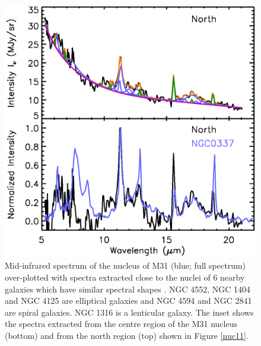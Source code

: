 \begin{figure}
\centering
\includegraphics[height = 8 cm]{./fig11.eps}
\caption{Mid-infrared spectrum of the nucleus of M31 (blue; full spectrum) over-plotted with spectra extracted close to the nuclei of 6 nearby galaxies 
which have similar spectral shapes \citep{Smith:2007lr}. NGC 4552, NGC 1404 and NGC 4125 are elliptical galaxies and NGC 4594 and NGC 2841 are spiral galaxies. 
NGC 1316 is a lenticular galaxy. The inset shows the spectra extracted from the centre region of the M31 nucleus (bottom) and from the north region (top) 
shown in Figure \ref{nuc11}.}
\label{smithspec}
\end{figure}


